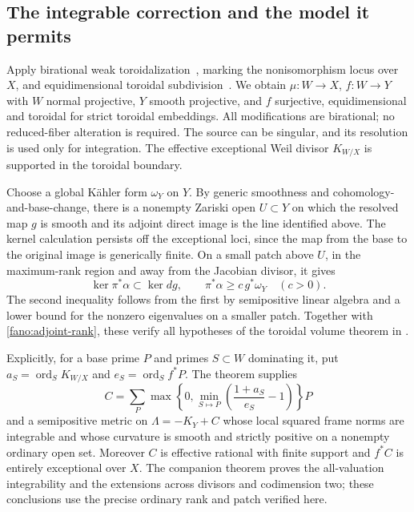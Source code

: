 \subsection{The integrable correction and the model it permits}

Apply birational weak toroidalization~\cite[Theorem~1.1]{ADK2013},
marking the nonisomorphism locus over $X$, and equidimensional
toroidal subdivision~\cite[Proposition~4.4]{AK2000}.  We obtain
$\mu:W\to X$, $f:W\to Y$ with $W$ normal projective, $Y$ smooth
projective, and $f$ surjective, equidimensional and toroidal for
strict toroidal embeddings.  All modifications are birational; no
reduced-fiber alteration is required.  The source can be singular,
and its resolution is used only for integration.  The effective
exceptional Weil divisor $K_{W/X}$ is supported in the toroidal
boundary.

Choose a global K\"ahler form $\omega_Y$ on $Y$.  By generic
smoothness and cohomology-and-base-change, there is a nonempty
Zariski open $U\subset Y$ on which the resolved map $g$ is smooth
and its adjoint direct image is the line identified above.  The
kernel calculation persists off the exceptional loci, since the map
from the base to the original image is generically finite.  On a
small patch above $U$, in the maximum-rank region and away from
the Jacobian divisor, it gives
\[
 \ker\pi^*\alpha\subset\ker dg,
 \qquad \pi^*\alpha\geq c\,g^*\omega_Y\quad(c>0).
\]
The second inequality follows from the first by semipositive linear algebra
and a lower bound for the nonzero eigenvalues on a smaller patch.
Together with \eqref{fano:adjoint-rank}, these verify all hypotheses
of the toroidal volume theorem in
\cite[Theorem~2.1]{CompanionG}.

Explicitly, for a base prime $P$ and primes $S\subset W$ dominating
it, put $a_S=\operatorname{ord}_S K_{W/X}$ and
$e_S=\operatorname{ord}_S f^*P$.  The theorem supplies
\begin{equation}\label{fano:correction}
 C=\sum_P\max\left\{0,\min_{S\mapsto P}
           \left(\frac{1+a_S}{e_S}-1\right)\right\}P
\end{equation}
and a semipositive metric on $\Lambda=-K_Y+C$ whose local squared
frame norms are integrable and whose curvature is smooth and
strictly positive on a nonempty ordinary open set.  Moreover $C$
is effective rational with finite support and $f^*C$ is entirely
exceptional over $X$.  The companion theorem proves the all-valuation
integrability and the extensions across divisors and codimension
two; these conclusions use the precise ordinary rank and patch
verified here.

